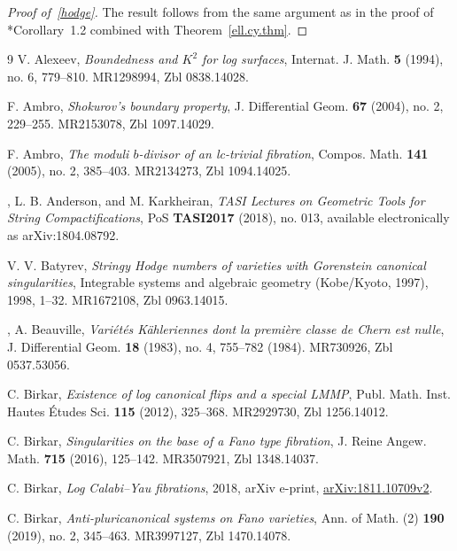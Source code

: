 \documentclass[11pt]{ip-journal}
\theoremstyle{definition}
\begin{document}
\begin{proof}[Proof of~\ref{hodge}] 
The result follows from the same argument as in the proof of \cite{DCS}*{Corollary~1.2} combined with Theorem~\ref{ell.cy.thm}. 
\end{proof}


% 
\begin{thebibliography}{9}
V. Alexeev,
\emph{Boundedness and {$K^2$} for log surfaces}, 
Internat. J. Math. 
\textbf{5}
(1994),
no. 6,
779--810.
MR1298994,
Zbl 0838.14028.

F. Ambro, 
{\it Shokurov's boundary property},
J. Differential Geom.
{\bf 67}
(2004),
no. 2,
229--255.
MR2153078,
Zbl 1097.14029.

F. Ambro, 
{\it The moduli {$b$}-divisor of an lc-trivial fibration},
Compos. Math.
{\bf 141}
(2005),
no. 2,
385--403.
MR2134273, 
Zbl 1094.14025.

,
L. B. Anderson, and M. Karkheiran, 
{\it TASI Lectures on Geometric Tools for String Compactifications},
PoS
{\bf TASI2017}
(2018), 
no. 013, 
available electronically as 
arXiv:1804.08792.

V. V. Batyrev,
{\it Stringy {H}odge numbers of varieties with {G}orenstein canonical singularities},
Integrable systems and algebraic geometry ({K}obe/{K}yoto, 1997), 
1998, 
1--32.
MR1672108,
Zbl 0963.14015.

,
A. Beauville, 
{\it Vari\'{e}t\'{e}s {K}\"{a}hleriennes dont la premi\`ere classe de {C}hern est nulle},
J. Differential Geom.
{\bf 18}
(1983),
no. 4,
755--782 
(1984).
MR730926,
Zbl 0537.53056.

C. Birkar,
{\it Existence of log canonical flips and a special {LMMP}},
Publ. Math. Inst. Hautes \'{E}tudes Sci.
{\bf 115}
(2012),
325--368.
MR2929730,
Zbl 1256.14012.

C. Birkar, 
{\it Singularities on the base of a {F}ano type fibration}, 
J. Reine Angew. Math.
{\bf 715}
(2016),
125--142.
MR3507921,
Zbl 1348.14037.

C. Birkar,
{\it Log {C}alabi--{Y}au fibrations},
2018,
arXiv e-print, 
\href{https://arxiv.org/abs/1811.10709}{arXiv:1811.10709v2}.

C. Birkar, 
{\it Anti-pluricanonical systems on {F}ano varieties},
Ann. of Math. (2)
{\bf 190}
(2019),
no. 2,
345--463.
MR3997127,
Zbl 1470.14078.


\end{thebibliography}
\end{document}
